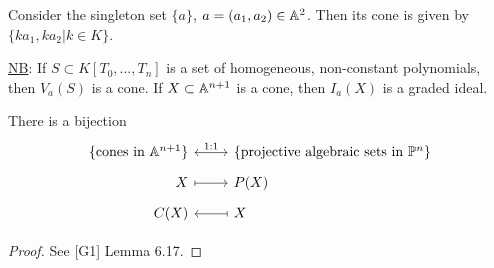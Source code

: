 \documentclass[a4paper,11pt]{article}
\begin{document}
			\begin{eg}
				Consider the singleton set $\{a\}$, $a=(a_1,a_2)\in\AA^2$. Then its cone is given by $\{ka_1,ka_2|k\in K\}$.  
			\end{eg}

			\noindent\underline{NB}: If $S\subset K[T_0,\dots,T_n]$ is a set of homogeneous, non-constant polynomials, then $V_a(S)$ is a cone. If $X\subset\AA^{n+1}$  is a cone, then $I_a(X)$ is a graded ideal.

			\begin{lemma}
				There is a bijection
				\begin{equation*}
					\begin{tikzcd}[row sep=tiny,
						/tikz/column 1/.append style={nodes={anchor=base east}},
						/tikz/column 2/.append style={nodes={anchor=base west}}]
						\{\text{cones in }\AA^{n+1}\}\ar[r,leftrightarrow,"1:1"] & \{\text{projective algebraic sets in }\P^n\}\\
						X\ar[r,mapsto] & P(X)\\
						C(X) & \ar[l,mapsto] X
					\end{tikzcd}
				\end{equation*}
			\end{lemma}
			\begin{proof}\renewcommand{\qedsymbol}{}
				See [G1] Lemma 6.17.
			\end{proof}\renewcommand{\qedsymbol}{$\square$}
\end{document}
